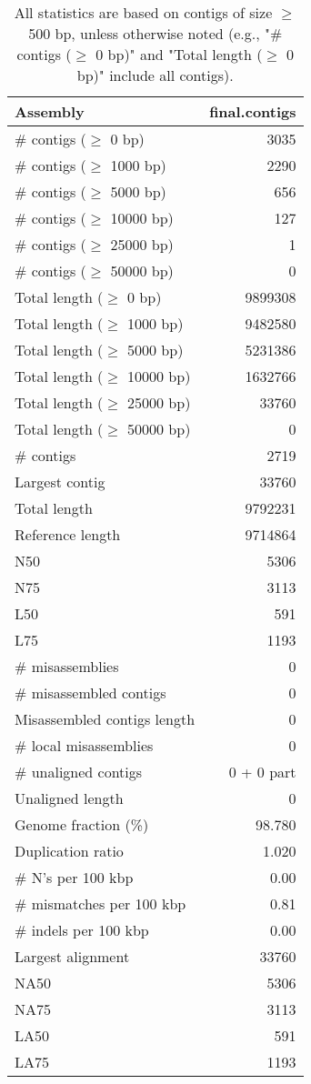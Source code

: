 \documentclass[12pt,a4paper]{article}
\begin{document}
\begin{table}[ht]
\begin{center}
\caption{All statistics are based on contigs of size $\geq$ 500 bp, unless otherwise noted (e.g., "\# contigs ($\geq$ 0 bp)" and "Total length ($\geq$ 0 bp)" include all contigs).}
\begin{tabular}{|l*{1}{|r}|}
\hline
Assembly & final.contigs \\ \hline
\# contigs ($\geq$ 0 bp) & 3035 \\ \hline
\# contigs ($\geq$ 1000 bp) & 2290 \\ \hline
\# contigs ($\geq$ 5000 bp) & 656 \\ \hline
\# contigs ($\geq$ 10000 bp) & 127 \\ \hline
\# contigs ($\geq$ 25000 bp) & 1 \\ \hline
\# contigs ($\geq$ 50000 bp) & 0 \\ \hline
Total length ($\geq$ 0 bp) & 9899308 \\ \hline
Total length ($\geq$ 1000 bp) & 9482580 \\ \hline
Total length ($\geq$ 5000 bp) & 5231386 \\ \hline
Total length ($\geq$ 10000 bp) & 1632766 \\ \hline
Total length ($\geq$ 25000 bp) & 33760 \\ \hline
Total length ($\geq$ 50000 bp) & 0 \\ \hline
\# contigs & 2719 \\ \hline
Largest contig & 33760 \\ \hline
Total length & 9792231 \\ \hline
Reference length & 9714864 \\ \hline
N50 & 5306 \\ \hline
N75 & 3113 \\ \hline
L50 & 591 \\ \hline
L75 & 1193 \\ \hline
\# misassemblies & 0 \\ \hline
\# misassembled contigs & 0 \\ \hline
Misassembled contigs length & 0 \\ \hline
\# local misassemblies & 0 \\ \hline
\# unaligned contigs & 0 + 0 part \\ \hline
Unaligned length & 0 \\ \hline
Genome fraction (\%) & 98.780 \\ \hline
Duplication ratio & 1.020 \\ \hline
\# N's per 100 kbp & 0.00 \\ \hline
\# mismatches per 100 kbp & 0.81 \\ \hline
\# indels per 100 kbp & 0.00 \\ \hline
Largest alignment & 33760 \\ \hline
NA50 & 5306 \\ \hline
NA75 & 3113 \\ \hline
LA50 & 591 \\ \hline
LA75 & 1193 \\ \hline
\end{tabular}
\end{center}
\end{table}
\end{document}
